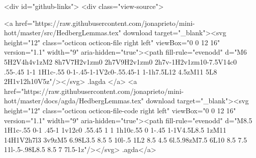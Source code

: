   <div id="github-links">
    <div class="view-source">
      
        <a href="https://raw.githubusercontent.com/jonaprieto/mini-hott/master/src/HedbergLemmas.tex" download target="_blank"><svg height="12" class="octicon octicon-file right left" viewBox="0 0 12 16" version="1.1" width="9" aria-hidden="true"><path fill-rule="evenodd" d="M6 5H2V4h4v1zM2 8h7V7H2v1zm0 2h7V9H2v1zm0 2h7v-1H2v1zm10-7.5V14c0 .55-.45 1-1 1H1c-.55 0-1-.45-1-1V2c0-.55.45-1 1-1h7.5L12 4.5zM11 5L8 2H1v12h10V5z"/></svg> .lagda </a>
        <a href="https://raw.githubusercontent.com/jonaprieto/mini-hott/master/docs/agda/HedbergLemmas.tex" download target="_blank"><svg height="12" class="octicon octicon-file-code right left" viewBox="0 0 12 16" version="1.1" width="9" aria-hidden="true"><path fill-rule="evenodd" d="M8.5 1H1c-.55 0-1 .45-1 1v12c0 .55.45 1 1 1h10c.55 0 1-.45 1-1V4.5L8.5 1zM11 14H1V2h7l3 3v9zM5 6.98L3.5 8.5 5 10l-.5 1L2 8.5 4.5 6l.5.98zM7.5 6L10 8.5 7.5 11l-.5-.98L8.5 8.5 7 7l.5-1z"/></svg> .agda</a>
      
